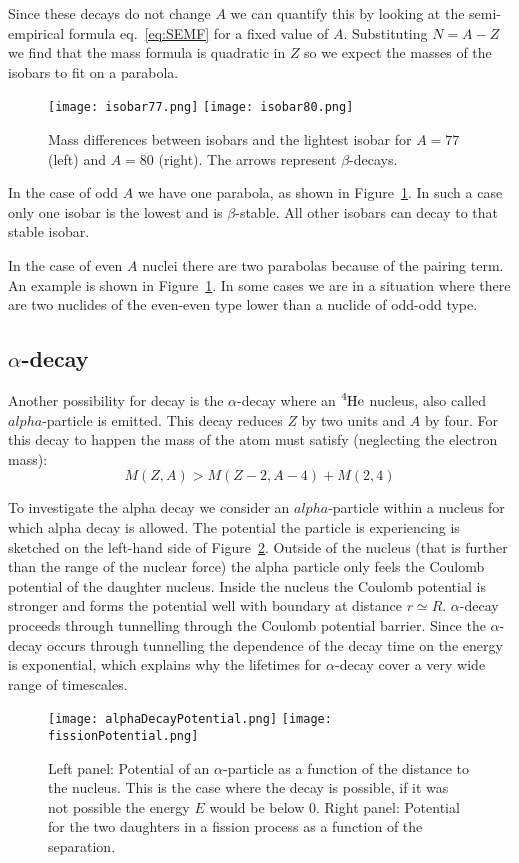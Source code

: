 \documentclass[12pt]{article}
\begin{document}
Since these decays do not change $A$ we can quantify this by looking at the semi-empirical formula eq.~\ref{eq:SEMF} for a fixed value of $A$. Substituting $N=A-Z$ we find that the mass formula is quadratic in $Z$ so we expect the masses of the isobars to fit on a parabola. 
\begin{figure}
\begin{center}
\texttt{[image: isobar77.png]}
\texttt{[image: isobar80.png]}
\end{center}
\caption{Mass differences between isobars and the lightest isobar for $A=77$ (left) and $A=80$ (right). The arrows represent $\beta$-decays.}\label{fig:isobars}
\end{figure}
In the case of odd $A$ we have one parabola, as shown in Figure~\ref{fig:isobars}. In such a case only one isobar is the lowest and is $\beta$-stable. All other isobars can decay to that stable isobar. 

In the case of even $A$ nuclei there are two parabolas because of the pairing term. An example is shown in Figure~\ref{fig:isobars}. In some cases we are in a situation where there are two nuclides of the even-even type lower than a nuclide of odd-odd type. 
%
%
%
\subsection{$\alpha$-decay}
%
%
%
Another possibility for decay is the $\alpha$-decay where an $\ce{^4He}$ nucleus, also called $alpha$-particle is emitted. This decay reduces $Z$ by two units and $A$ by four. For this decay to happen the mass of the atom must satisfy (neglecting the electron mass):
\[M(Z,A)> M(Z-2,A-4)+M(2,4)\]

To investigate the alpha decay we consider an $alpha$-particle within a nucleus for which alpha decay is allowed. The potential the particle is experiencing is sketched on the left-hand side of Figure~\ref{fig:fissionPotentials}. Outside of the nucleus (that is further than the range of the nuclear force) the alpha particle only feels the Coulomb potential of the daughter nucleus. Inside the nucleus the Coulomb potential is stronger and forms the potential well with boundary at distance $r\simeq R$. $\alpha$-decay proceeds through tunnelling through the Coulomb potential barrier. Since the $\alpha$-decay occurs through tunnelling the dependence of the decay time on the energy is exponential, which explains why the lifetimes for $\alpha$-decay cover a very wide range of timescales.    
\begin{figure}
\begin{center}
\texttt{[image: alphaDecayPotential.png]}
\texttt{[image: fissionPotential.png]}
\end{center}
\caption{Left panel: Potential of an $\alpha$-particle as a function of the distance to the nucleus. This is the case where the decay is possible, if it was not possible the energy $E$ would be below $0$. Right panel: Potential for the two daughters in a fission process as a function of the separation.}\label{fig:fissionPotentials}
\end{figure}
%
%
%
\end{document}
